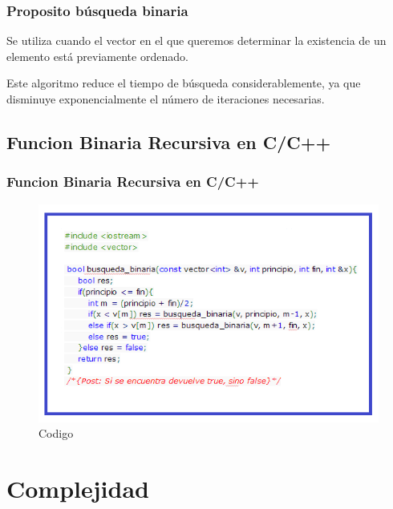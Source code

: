 \documentclass{beamer}
\begin{document}
		\begin{frame}
			\frametitle{Proposito búsqueda binaria}
				
			\begin{center}
			Se utiliza cuando el vector en el que queremos determinar la existencia de un elemento está previamente ordenado.

			Este algoritmo reduce el tiempo de búsqueda considerablemente, ya que disminuye exponencialmente el número de iteraciones necesarias.
			\end{center}
		\end{frame}


	\subsection{Funcion Binaria Recursiva en C/C++}


		\begin{frame}
			\frametitle{Funcion Binaria Recursiva en C/C++}
			\begin{figure}
  				\centering
    			           \includegraphics[scale=0.6]{CodigoC.png}
  				\caption{Codigo}
  				\label{fig:lls}
			\end{figure}
			
		\end{frame}

		
\section{Complejidad}
\end{document}
